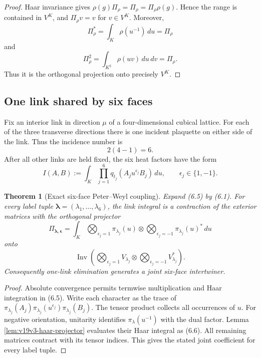 \documentclass[11pt]{article}
\newtheorem{theorem}{Theorem}[section]
\theoremstyle{remark}
\begin{document}
\begin{proof}
Haar invariance gives
\(\rho(g)\Pi_\rho=\Pi_\rho=\Pi_\rho\rho(g)\).  Hence the range is contained
in \(V^K\), and \(\Pi_\rho v=v\) for \(v\in V^K\).
Moreover,
\[
 \Pi_\rho^*=\int_K\rho(u^{-1})\,du=\Pi_\rho
\]
and
\[
 \Pi_\rho^2=\int_{K^2}\rho(uv)\,du\,dv=\Pi_\rho.
\]
Thus it is the orthogonal projection onto precisely \(V^K\).
\end{proof}

\subsection{One link shared by six faces}

Fix an interior link in direction \(\mu\) of a four-dimensional cubical
lattice.  For each of the three transverse directions there is one incident
plaquette on either side of the link.  Thus the incidence number is
\[
 2(4-1)=6.                                                  \tag{6.4}
\]
After all other links are held fixed, the six heat factors have the form
\[
 I(A,B):=\int_K\prod_{j=1}^6
 q_{t_j}(A_j u^{\epsilon_j}B_j)\,du,\qquad
 \epsilon_j\in\{1,-1\}.                                    \tag{6.5}
\]

\begin{theorem}[Exact six-face Peter--Weyl coupling]
\label{thm:v19v3-six-face}
Expand (6.5) by (6.1).  For every label tuple
\(\boldsymbol\lambda=(\lambda_1,\ldots,\lambda_6)\), the link integral is a
contraction of the exterior matrices with the orthogonal projector
\[
 \Pi_{\boldsymbol\lambda,\boldsymbol\epsilon}
 =\int_K
 \bigotimes_{\epsilon_j=1}\pi_{\lambda_j}(u)
 \otimes
 \bigotimes_{\epsilon_j=-1}\pi_{\lambda_j}(u)^*
 \,du                                                     \tag{6.6}
\]
onto
\[
 \operatorname{Inv}\left(
 \bigotimes_{\epsilon_j=1}V_{\lambda_j}\otimes
 \bigotimes_{\epsilon_j=-1}V_{\lambda_j}^*
 \right).                                                  \tag{6.7}
\]
Consequently one-link elimination generates a joint six-face intertwiner.
\end{theorem}

\begin{proof}
Absolute convergence permits termwise multiplication and Haar integration
in (6.5).  Write each character as the trace of
\(\pi_{\lambda_j}(A_j)\pi_{\lambda_j}(u^{\epsilon_j})
\pi_{\lambda_j}(B_j)\).  The tensor product collects all occurrences of
\(u\).  For negative orientation, unitarity identifies
\(\pi_\lambda(u^{-1})\) with the dual factor.  Lemma
\ref{lem:v19v3-haar-projector} evaluates their Haar integral as (6.6).
All remaining matrices contract with its tensor indices.  This gives the
stated joint coefficient for every label tuple.
\end{proof}
\end{document}
